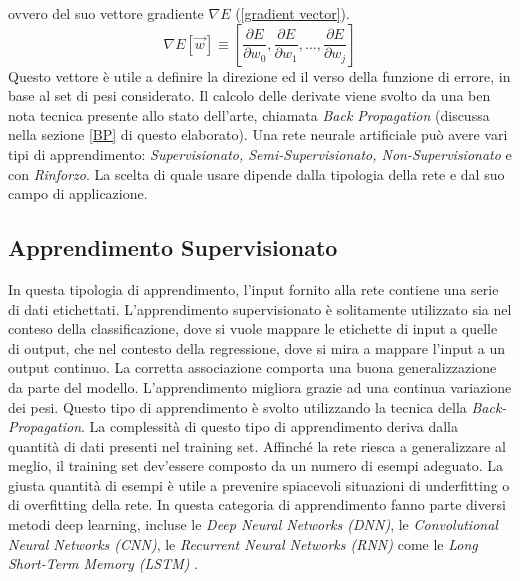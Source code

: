 ovvero del suo vettore gradiente $\nabla{E}$ (\ref{gradient vector}). 
\begin{equation}\label{gradient vector}
    \nabla{E}[\vec{w}]\equiv\left[\frac{\partial E}{\partial w_{0}}, \frac{\partial E}{\partial w_{1}}, \dots, \frac{\partial E}{\partial w_{j}}\right]
\end{equation}
Questo vettore è utile a definire la direzione ed il verso della funzione di errore, 
in base al set di pesi considerato. Il calcolo delle derivate viene svolto da una ben 
nota tecnica presente allo stato dell'arte, chiamata \emph{Back Propagation} (discussa 
nella sezione \ref{BP} di questo elaborato). Una rete neurale artificiale può avere vari 
tipi di apprendimento: \emph{Supervisionato, Semi-Supervisionato, Non-Supervisionato} 
e con \emph{Rinforzo}. La scelta di quale usare dipende dalla tipologia della rete e dal 
suo campo di applicazione.

\subsection{Apprendimento Supervisionato}
In questa tipologia di apprendimento, l'input fornito alla rete contiene una serie di 
dati etichettati. L'apprendimento supervisionato è solitamente utilizzato sia nel 
conteso della classificazione, dove  si vuole mappare le etichette di input a quelle 
di output, che nel contesto della regressione, dove si mira a mappare l'input a un 
output continuo. La corretta associazione comporta una buona generalizzazione 
da parte del modello. L'apprendimento migliora grazie ad una continua variazione 
dei pesi. Questo tipo di apprendimento è svolto utilizzando la tecnica della 
\emph{Back-Propagation}. La complessità di questo tipo di apprendimento deriva dalla 
quantità di dati presenti nel training set. Affinché la rete riesca a generalizzare al 
meglio, il training set dev'essere composto da un numero di esempi adeguato. La 
giusta quantità di esempi è utile a prevenire spiacevoli situazioni di underfitting o 
di overfitting della rete. In questa categoria di apprendimento fanno parte diversi metodi deep 
learning, incluse le \emph{Deep Neural Networks (DNN)}, le \emph{Convolutional Neural 
Networks (CNN)}, le \emph{Recurrent Neural Networks (RNN)} come le \emph{Long 
Short-Term Memory (LSTM)} \cite{LSTM}.

